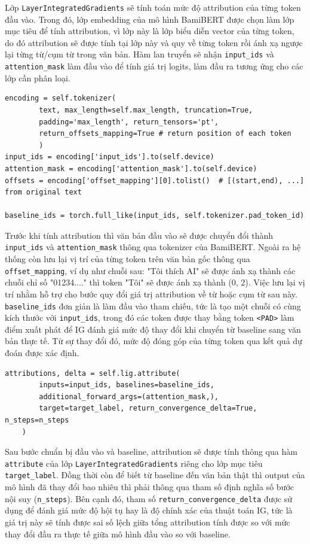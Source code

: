 Lớp \texttt{LayerIntegratedGradients} sẽ tính toán mức độ attribution của từng token đầu vào. Trong đó, lớp embedding của mô hình BamiBERT được chọn làm lớp mục tiêu để tính attribution, vì 
lớp này là lớp biểu diễn vector của từng token, do đó attribution sẽ được tính tại lớp này và quy về từng token rồi ánh xạ ngược lại từng từ/cụm từ trong văn bản. Hàm lan truyển sẽ nhận \texttt{input\_ids} và
\texttt{attention\_mask} làm đầu vào để tính giá trị logits, làm đầu ra tương ứng cho các lớp cần phân loại.

\begin{lstlisting}[style=pythoncode]
encoding = self.tokenizer(
        text, max_length=self.max_length, truncation=True,
        padding='max_length', return_tensors='pt',
        return_offsets_mapping=True # return position of each token
        )
input_ids = encoding['input_ids'].to(self.device)
attention_mask = encoding['attention_mask'].to(self.device)
offsets = encoding['offset_mapping'][0].tolist()  # [(start,end), ...] from original text

baseline_ids = torch.full_like(input_ids, self.tokenizer.pad_token_id)
\end{lstlisting}

Trước khi tính attribution thì văn bản đầu vào sẽ được chuyển đổi thành \texttt{input\_ids} và \texttt{attention\_mask} thông qua tokenizer của BamiBERT. Ngoài ra hệ thống còn lưu lại vị trí
của từng token trên văn bản gốc thông qua \texttt{offset\_mapping}, ví dụ như chuỗi sau: "Tôi thích AI" sẽ được ánh xạ thành các chuỗi chỉ số "01234...." thì token "Tôi" sẽ được ánh xạ thành (0, 2). Việc
lưu lại vị trí nhằm hỗ trợ cho bước quy đổi giá trị attribution về từ hoặc cụm từ sau này. \texttt{baseline\_ids} đơn giản là làm đầu vào tham chiếu, tức là tạo một chuỗi có cùng kích thước với \texttt{input\_ids},
trong đó các token được thay bằng token \texttt{<PAD>} làm điểm xuất phát để IG đánh giá mức độ thay đổi khi chuyển từ baseline sang văn bản thực tế. Từ sự thay đổi đó, mức độ đóng góp của từng token qua kết quả dự
đoán được xác định.

\begin{lstlisting}[style=pythoncode]
attributions, delta = self.lig.attribute(
        inputs=input_ids, baselines=baseline_ids,
        additional_forward_args=(attention_mask,),
        target=target_label, return_convergence_delta=True, n_steps=n_steps
    )
\end{lstlisting}
Sau bước chuẩn bị đầu vào và baseline, attribution sẽ được tính thông qua hàm \texttt{attribute} của lớp \texttt{LayerIntegratedGradients} riêng cho lớp mục tiêu \texttt{target\_label}. Đồng thời còn để biết từ baseline đến
văn bản thật thì output của mô hình đã thay đổi bao nhiêu thì phải thông qua tham số định nghĩa số bước nội suy (\texttt{n\_steps}). Bên cạnh đó, tham số \texttt{return\_convergence\_delta} được sử dụng để đánh giá mức độ hội tụ
hay là độ chính xác của thuật toán IG, tức là giá trị này sẽ tính được sai số lệch giữa tổng attribution tính được so với mức thay đổi đầu ra thực tế giữa mô hình đầu vào so với baseline.

